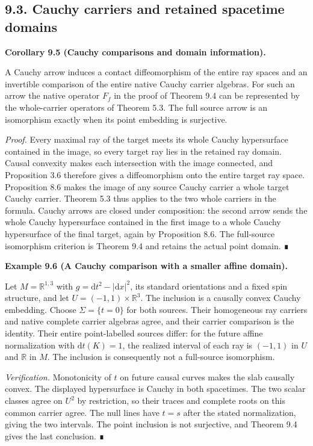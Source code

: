 \documentclass[
  english,
  11pt,
  reqno]{amsart}
\makeatletter
\newcommand{\paperdisplaynext}{%
  \let\paper@savedstartsection\@startsection
  \def\@startsection##1##2##3##4##5##6{%
    \let\@startsection\paper@savedstartsection
    \@tempskipa ##5\relax
    \ifdim\@tempskipa<\z@
      \def\paper@afterskip{.35\baselineskip}%
    \else
      \def\paper@afterskip{##5}%
    \fi
    \@startsection{##1}{##2}{##3}{##4}{\paper@afterskip}{##6}}}
\newcommand{\paperdisplaysection}{\paperdisplaynext\subsection}
\newcommand{\pandocstatementheading}[1]{%
  \par\if@nobreak\else
    \addpenalty{\@beginparpenalty}%
    \addvspace{.5\baselineskip plus .2\baselineskip minus .2\baselineskip}%
  \fi
  {\normalfont\bfseries #1\par}%
  \nobreak\@afterindenttrue\@afterheading
}
\makeatother
\begin{document}
\protect{}\label{sec:global-source-cauchy-embeddings}
\paperdisplaysection{9.3. Cauchy carriers and retained spacetime
domains}\label{cauchy-carriers-and-retained-spacetime-domains}
\pandocstatementheading{\protect{}\label{cor:global-cauchy-source-carriers}Corollary 9.5 (Cauchy comparisons and domain information).}

A Cauchy arrow induces a contact diffeomorphism of the entire ray spaces
and an invertible comparison of the entire native Cauchy carrier
algebras. For such an arrow the native operator \(F_f\) in the proof of
Theorem 9.4 can be represented by the whole-carrier operators of Theorem
5.3. The full source arrow is an isomorphism exactly when its point
embedding is surjective.

\emph{Proof.} Every maximal ray of the target meets its whole Cauchy
hypersurface contained in the image, so every target ray lies in the
retained ray domain. Causal convexity makes each intersection with the
image connected, and Proposition 3.6 therefore gives a diffeomorphism
onto the entire target ray space. Proposition 8.6 makes the image of any
source Cauchy carrier a whole target Cauchy carrier. Theorem 5.3 thus
applies to the two whole carriers in the formula. Cauchy arrows are
closed under composition: the second arrow sends the whole Cauchy
hypersurface contained in the first image to a whole Cauchy hypersurface
of the final target, again by Proposition 8.6. The full-source
isomorphism criterion is Theorem 9.4 and retains the actual point
domain. ∎

\pandocstatementheading{\protect{}\label{ex:global-cauchy-slab-domain}Example 9.6 (A Cauchy comparison with a smaller affine domain).}

Let \(M=\mathbb R^{1,3}\) with \(g=\mathrm dt^2-|\mathrm dx|^2\), its
standard orientations and a fixed spin structure, and let
\(U=(-1,1)\times\mathbb R^3\). The inclusion is a causally convex Cauchy
embedding. Choose \(\Sigma=\{t=0\}\) for both sources. Their homogeneous
ray carriers and native complete carrier algebras agree, and their
carrier comparison is the identity. Their entire point-labelled sources
differ: for the future affine normalization with \(\mathrm dt(K)=1\),
the realized interval of each ray is \((-1,1)\) in \(U\) and
\(\mathbb R\) in \(M\). The inclusion is consequently not a full-source
isomorphism.

\emph{Verification.} Monotonicity of \(t\) on future causal curves makes
the slab causally convex. The displayed hypersurface is Cauchy in both
spacetimes. The two scalar classes agree on \(U^2\) by restriction, so
their traces and complete roots on this common carrier agree. The null
lines have \(t=s\) after the stated normalization, giving the two
intervals. The point inclusion is not surjective, and Theorem 9.4 gives
the last conclusion. ∎
\end{document}
